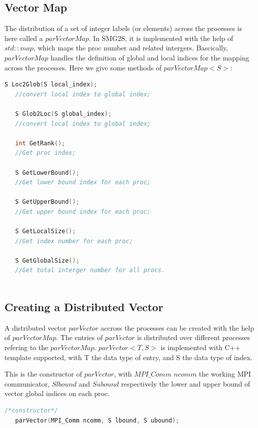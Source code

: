 \documentclass[a4paper, 10 pt]{report}
\begin{document}
	\subsection{Vector Map}
	
	The distribution of a set of integer labels (or elements) across the processes is here called a
	$parVectorMap$. In SMG2S, it is implemented with the help of $std::map$, which maps the proc number and related intergers. Bascically, 	$parVectorMap$ handles the definition of global and local indices for the mapping across the processes. Here we give some methods of $parVectorMap<S>$:
	
		\begin{lstlisting}[language=C++,frame=single]
   S Loc2Glob(S local_index);
   //convert local index to global index;
	
   S Glob2Loc(S global_index);
   //convert local index to global index;

   int GetRank();
   //Get proc index;
   
   S GetLowerBound();
   //Get lower bound index for each proc;
  
   S GetUpperBound();
   //Get upper bound index for each proc;
   
   S GetLocalSize();
   //Get index number for each proc;
   
   S GetGlobalSize();
   //Get total interger number for all procs.
   
	\end{lstlisting}
	
	\subsection{Creating a Distributed Vector}
	
	A distributed vector $parVector$ accross the processes can be created with the help of $parVectorMap$. The entries of $parVector$ is distributed over different processes refering to the $parVectorMap$. $parVector<T,S>$ is implemented with C++ template supported, with T the data type of entry, and S the data type of index.  

This is the constructor of $parVector$, with $MPI\_Comm$ $ncomm$ the working MPI communicator, $S$$ lbound$ and $S$$ ubound$ respectively the lower and upper bound of vector global indices on each proc.
\begin{lstlisting}[language=C++,frame=single]
   /*constructor*/
   parVector(MPI_Comm ncomm, S lbound, S ubound);
\end{lstlisting}
\end{document}
